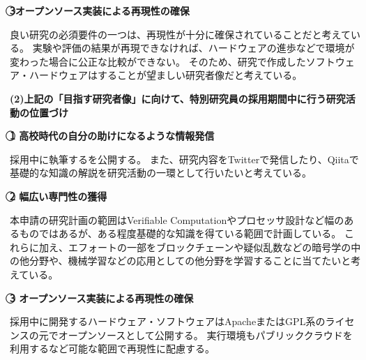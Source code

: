 \noindent\textbf{\textcircled{3}オープンソース実装による再現性の確保}

良い研究の必須要件の一つは、再現性が十分に確保されていることだと考えている。
実験や評価の結果が再現できなければ、ハードウェアの進歩などで環境が変わった場合に公正な比較ができない。
そのため、研究で作成したソフトウェア・ハードウェアはすることが望ましい研究者像だと考えている。



\vspace{5mm}
\noindent
\textbf{(2)上記の「目指す研究者像」に向けて、特別研究員の採用期間中に行う研究活動の位置づけ}

\noindent\textbf{\textcircled{1} 高校時代の自分の助けになるような情報発信}

採用中に執筆するを公開する。
また、研究内容をTwitterで発信したり、Qiitaで基礎的な知識の解説を研究活動の一環として行いたいと考えている。

\noindent\textbf{\textcircled{2} 幅広い専門性の獲得}

本申請の研究計画の範囲はVerifiable Computationやプロセッサ設計など幅のあるものではあるが、ある程度基礎的な知識を得ている範囲で計画している。
これらに加え、エフォートの一部をブロックチェーンや疑似乱数などの暗号学の中の他分野や、機械学習などの応用としての他分野を学習することに当てたいと考えている。

\noindent\textbf{\textcircled{3} オープンソース実装による再現性の確保}

採用中に開発するハードウェア・ソフトウェアはApacheまたはGPL系のライセンスの元でオープンソースとして公開する。
実行環境もパブリッククラウドを利用するなど可能な範囲で再現性に配慮する。







